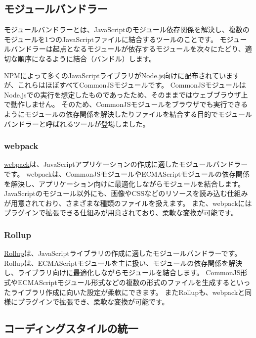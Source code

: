 \hypertarget{module-bundler}{%
\subsection{モジュールバンドラー}\label{module-bundler}}

モジュールバンドラーとは、JavaScriptのモジュール依存関係を解決し、複数のモジュールを1つのJavaScriptファイルに結合するツールのことです。
モジュールバンドラーは起点となるモジュールが依存するモジュールを次々にたどり、適切な順序になるように結合（バンドル）します。

NPMによって多くのJavaScriptライブラリがNode.js向けに配布されていますが、これらはほぼすべてCommonJSモジュールです。
CommonJSモジュールはNode.jsでの実行を想定したものであったため、そのままではウェブブラウザ上で動作しません。
そのため、CommonJSモジュールをブラウザでも実行できるようにモジュールの依存関係を解決したりファイルを結合する目的でモジュールバンドラーと呼ばれるツールが登場しました。

\hypertarget{webpack}{%
\subsubsection{webpack}\label{webpack}}

\href{https://webpack.js.org/}{webpack}は、JavaScriptアプリケーションの作成に適したモジュールバンドラーです。
webpackは、CommonJSモジュールやECMAScriptモジュールの依存関係を解決し、アプリケーション向けに最適化しながらモジュールを結合します。
JavaScriptのモジュール以外にも、画像やCSSなどのリソースを読み込む仕組みが用意されており、さまざまな種類のファイルを扱えます。
また、webpackにはプラグインで拡張できる仕組みが用意されており、柔軟な変換が可能です。

\hypertarget{rollup}{%
\subsubsection{Rollup}\label{rollup}}

\href{https://rollupjs.org/}{Rollup}は、JavaScriptライブラリの作成に適したモジュールバンドラーです。
Rollupは、ECMAScriptモジュールを主に扱い、モジュールの依存関係を解決し、ライブラリ向けに最適化しながらモジュールを結合します。
CommonJS形式やECMAScriptモジュール形式などの複数の形式のファイルを生成するといったライブラリ作成に向いた設定が柔軟にできます。
またRollupも、webpackと同様にプラグインで拡張でき、柔軟な変換が可能です。

\hypertarget{coding-style}{%
\subsection{コーディングスタイルの統一}\label{coding-style}}

